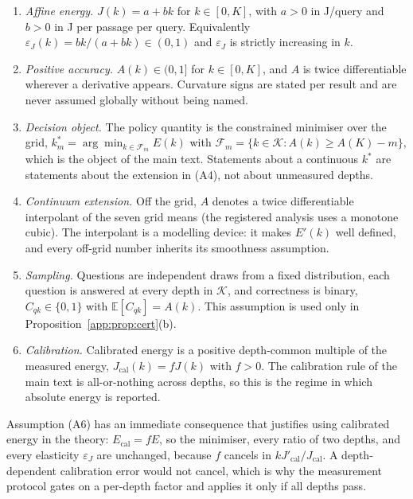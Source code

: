 \begin{enumerate}
  \item[(A1)] \emph{Affine energy.} $J(k)=a+bk$ for $k\in[0,K]$, with $a>0$ in
  J/query and $b>0$ in J per passage per query. Equivalently
  $\varepsilon_{J}(k)=bk/(a+bk)\in(0,1)$ and $\varepsilon_{J}$ is strictly
  increasing in $k$.

  \item[(A2)] \emph{Positive accuracy.} $A(k)\in(0,1]$ for $k\in[0,K]$, and $A$ is
  twice differentiable wherever a derivative appears. Curvature signs are stated
  per result and are never assumed globally without being named.

  \item[(A3)] \emph{Decision object.} The policy quantity is the constrained
  minimiser over the grid, $k^{*}_{m}=\arg\min_{k\in\mathcal{F}_{m}}E(k)$ with
  $\mathcal{F}_{m}=\{k\in\mathcal{K}:A(k)\ge A(K)-m\}$, which is the object of the
  main text. Statements about a continuous $k^{*}$ are statements about the
  extension in (A4), not about unmeasured depths.

  \item[(A4)] \emph{Continuum extension.} Off the grid, $A$ denotes a twice
  differentiable interpolant of the seven grid means (the registered analysis
  uses a monotone cubic). The interpolant is a modelling device: it makes
  $E'(k)$ well defined, and every off-grid number inherits its smoothness
  assumption.

  \item[(A5)] \emph{Sampling.} Questions are independent draws from a fixed
  distribution, each question is answered at every depth in $\mathcal{K}$, and
  correctness is binary, $C_{qk}\in\{0,1\}$ with $\mathbb{E}[C_{qk}]=A(k)$. This
  assumption is used only in Proposition~\ref{app:prop:cert}(b).

  \item[(A6)] \emph{Calibration.} Calibrated energy is a positive depth-common
  multiple of the measured energy, $J_{\mathrm{cal}}(k)=fJ(k)$ with $f>0$. The
  calibration rule of the main text is all-or-nothing across depths, so this is
  the regime in which absolute energy is reported.
\end{enumerate}

Assumption (A6) has an immediate consequence that justifies using calibrated
energy in the theory: $E_{\mathrm{cal}}=fE$, so the minimiser, every ratio of two
depths, and every elasticity $\varepsilon_{J}$ are unchanged, because $f$ cancels
in $kJ'_{\mathrm{cal}}/J_{\mathrm{cal}}$. A depth-dependent calibration error
would not cancel, which is why the measurement protocol gates on a per-depth
factor and applies it only if all depths pass.

